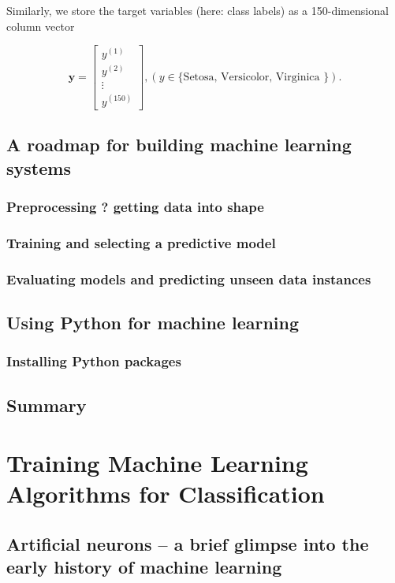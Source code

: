 \documentclass{report}
\begin{document}
Similarly, we store the target variables (here: class labels) as a 150-dimensional column vector

\[
\mathbf{y} = \begin{bmatrix}
    y^{(1)}  \\
    y^{(2)}  \\
    \vdots  \\
    y^{(150)}
\end{bmatrix}
, (y \in \{ \text{Setosa, Versicolor, Virginica \}}).\]

\newpage

\section{A roadmap for building machine learning systems}
\subsection{Preprocessing ? getting data into shape}
\subsection{Training and selecting a predictive model}
\subsection{Evaluating models and predicting unseen data instances}
\section{Using Python for machine learning}
\subsection{Installing Python packages}
\section{Summary}










\chapter{Training Machine Learning Algorithms for Classification}

\section{Artificial neurons -- a brief glimpse into the early history of machine learning}
\end{document}
